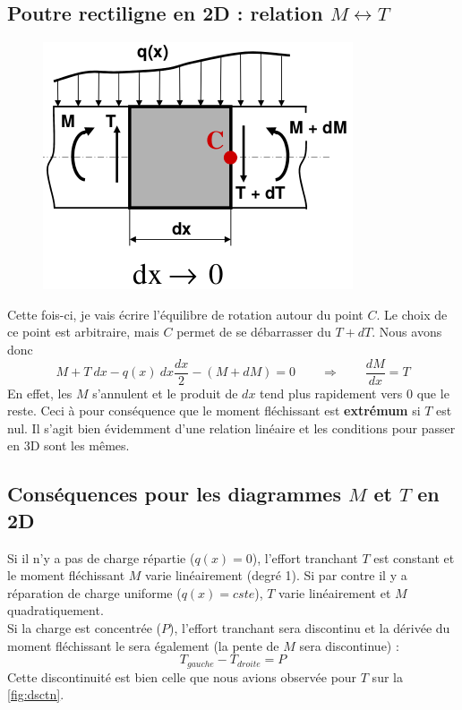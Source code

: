 	\subsection{Poutre rectiligne en 2D : relation $M \leftrightarrow T$}
	\begin{figure}
	\vspace{-5mm}
	\includegraphics[scale=0.45]{ch2/image12.png}
	\end{figure}
	Cette fois-ci, je vais écrire l'équilibre de rotation autour du 
	point $C$. Le choix de ce point est arbitraire, mais $C$ permet de 
	se débarrasser du $T+dT$. Nous avons donc
	\begin{equation}
	M + T\ dx - q(x)\ dx \frac{dx}{2} - (M+dM)=0\qquad\Longrightarrow\qquad
	\dfrac{dM}{dx}= T
	\end{equation}
	En effet, les $M$ s'annulent et le produit de $dx$ tend plus rapidement 
	vers 0 que le reste. Ceci à pour conséquence que le moment fléchissant 
	est \textbf{extrémum} si $T$ est nul. Il s'agit bien évidemment d'une 
	relation linéaire et les conditions pour passer en 3D sont les mêmes.
	
	
	\subsection{Conséquences pour les diagrammes $M$ et $T$ en 2D}
	Si il n'y a pas de charge répartie ($q(x)=0$), l'effort tranchant $T$ est 
	constant et le moment fléchissant $M$ varie linéairement (degré 1). Si 
	par contre il y a réparation de charge uniforme ($q(x)=cste$), $T$ varie 
	linéairement et $M$ quadratiquement.\\
	
	Si la charge est concentrée ($P$), l'effort tranchant sera discontinu et la 
	dérivée du moment fléchissant le sera également (la pente de $M$ sera 
	discontinue) :
	\begin{equation}
	T_{gauche} - T_{droite} = P
	\end{equation}
	Cette discontinuité est bien celle que nous avions observée pour $T$ sur 
	la \autoref{fig:dsctn}.\\
	
